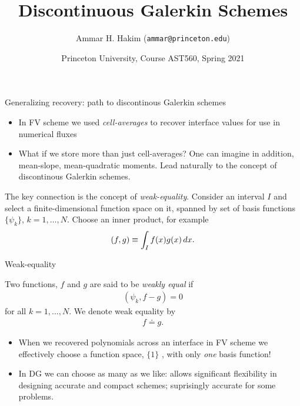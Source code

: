 \documentclass[aspectratio=169]{beamer}
\title[{\tt }]{Discontinuous Galerkin Schemes}%
\author[https://ast560.rtfd.io]%
{Ammar H. Hakim ({\tt ammar@princeton.edu}) \inst{1}}%
\institute[PPPL]
{ \inst{1} Princeton Plasma Physics Laboratory, Princeton, NJ %
}
\date[3/30/2021]{Princeton University, Course AST560, Spring 2021}
\newcommand{\mypause}{}
\begin{document}
\begin{frame}[plain]
  \titlepage
\end{frame}

\begin{frame}{Generalizing recovery: path to discontinous Galerkin schemes}
  \begin{itemize}
  \item In FV scheme we used \emph{cell-averages} to recover interface
    values for use in numerical fluxes%
    \mypause%
  \item What if we store more than just cell-averages? One can imagine
    in addition, mean-slope, mean-quadratic moments. Lead naturally to
    the concept of discontinous Galerkin schemes.
  \end{itemize}
  \mypause%
  The key connection is the concept of \emph{weak-equality}. Consider
  an interval $I$ and select a finite-dimensional function space on
  it, spanned by set of basis functions $\{ \psi_k \}$,
  $k=1,\ldots,N$. Choose an inner product, for example
  \begin{align*}
    (f, g) \equiv \int_I f(x) g(x) \thinspace dx.
  \end{align*}  
\end{frame}

\begin{frame}{Weak-equality}
  \small
  \begin{definition}
    Two functions, $f$ and $g$ are said to be \emph{weakly equal} if
    \begin{align*}
      (\psi_k,f-g) = 0
    \end{align*}
    for all $k=1,\ldots,N$. We denote weak equality by
    \begin{align*}
      f \doteq g.
    \end{align*}
  \end{definition}  
  \begin{itemize}
  \item When we recovered polynomials across an interface in FV scheme
    we effectively choose a function space, $\{1 \}$ , with only
    \emph{one} basis function!
  \item In DG we can choose as many as we like: allows significant
    flexibility in designing accurate and compact schemes; suprisingly
    accurate for some problems.
  \end{itemize}
\end{frame}
  
\end{document}
